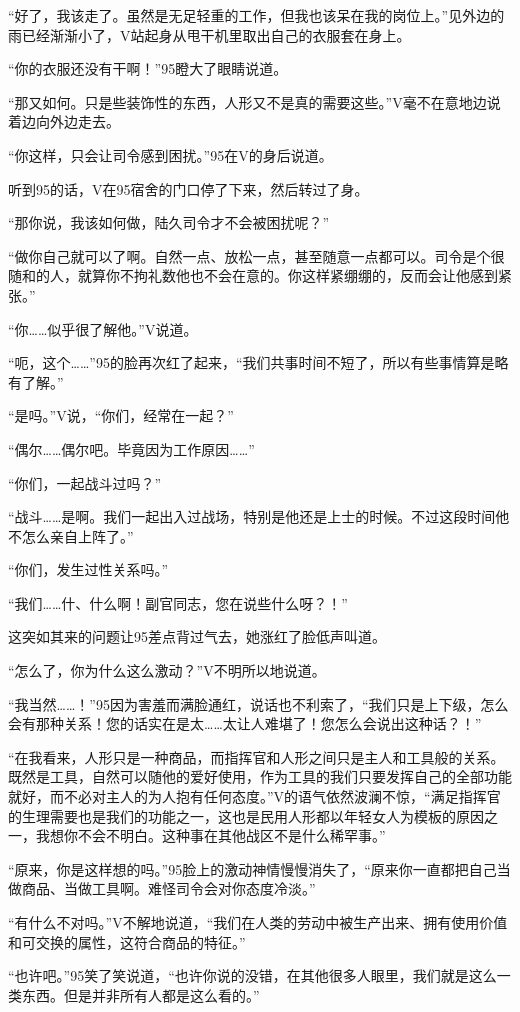 “好了，我该走了。虽然是无足轻重的工作，但我也该呆在我的岗位上。”见外边的雨已经渐渐小了，V站起身从甩干机里取出自己的衣服套在身上。

“你的衣服还没有干啊！”95瞪大了眼睛说道。

“那又如何。只是些装饰性的东西，人形又不是真的需要这些。”V毫不在意地边说着边向外边走去。

“你这样，只会让司令感到困扰。”95在V的身后说道。

听到95的话，V在95宿舍的门口停了下来，然后转过了身。

“那你说，我该如何做，陆久司令才不会被困扰呢？”

“做你自己就可以了啊。自然一点、放松一点，甚至随意一点都可以。司令是个很随和的人，就算你不拘礼数他也不会在意的。你这样紧绷绷的，反而会让他感到紧张。”

“你……似乎很了解他。”V说道。

“呃，这个……”95的脸再次红了起来，“我们共事时间不短了，所以有些事情算是略有了解。”

“是吗。”V说，“你们，经常在一起？”

“偶尔……偶尔吧。毕竟因为工作原因……”

“你们，一起战斗过吗？”

“战斗……是啊。我们一起出入过战场，特别是他还是上士的时候。不过这段时间他不怎么亲自上阵了。”

“你们，发生过性关系吗。”

“我们……什、什么啊！副官同志，您在说些什么呀？！”

这突如其来的问题让95差点背过气去，她涨红了脸低声叫道。

“怎么了，你为什么这么激动？”V不明所以地说道。

“我当然……！”95因为害羞而满脸通红，说话也不利索了，“我们只是上下级，怎么会有那种关系！您的话实在是太……太让人难堪了！您怎么会说出这种话？！”

“在我看来，人形只是一种商品，而指挥官和人形之间只是主人和工具般的关系。既然是工具，自然可以随他的爱好使用，作为工具的我们只要发挥自己的全部功能就好，而不必对主人的为人抱有任何态度。”V的语气依然波澜不惊，“满足指挥官的生理需要也是我们的功能之一，这也是民用人形都以年轻女人为模板的原因之一，我想你不会不明白。这种事在其他战区不是什么稀罕事。”

“原来，你是这样想的吗。”95脸上的激动神情慢慢消失了，“原来你一直都把自己当做商品、当做工具啊。难怪司令会对你态度冷淡。”

“有什么不对吗。”V不解地说道，“我们在人类的劳动中被生产出来、拥有使用价值和可交换的属性，这符合商品的特征。”

“也许吧。”95笑了笑说道，“也许你说的没错，在其他很多人眼里，我们就是这么一类东西。但是并非所有人都是这么看的。”

